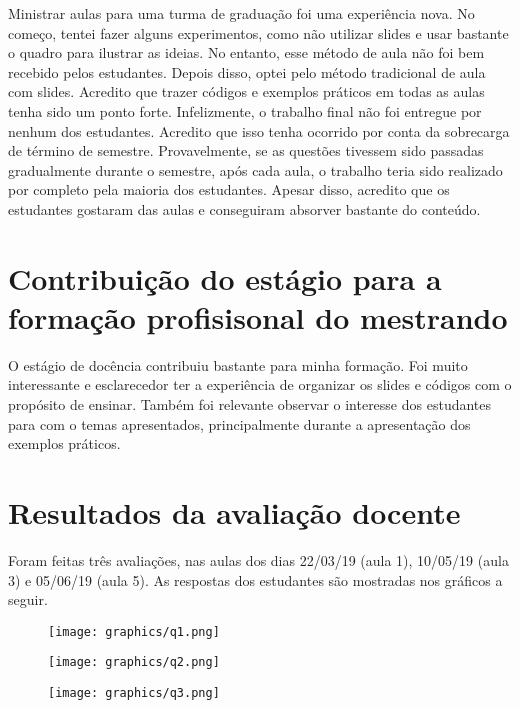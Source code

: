 \documentclass[
	12pt,				%
	openright,			%
	oneside,			%
	a4paper,			%
	chapter=TITLE,		%
	section=TITLE,		%
	english,			%
	french,				%
	spanish,			%
	brazil				%
	]{abntex2}
\begin{document}
Ministrar aulas para uma turma de graduação foi uma experiência nova.
No começo, tentei fazer alguns experimentos, como não utilizar slides e usar bastante o quadro para ilustrar as ideias.
No entanto, esse método de aula não foi bem recebido pelos estudantes.
Depois disso, optei pelo método tradicional de aula com slides.
Acredito que trazer códigos e exemplos práticos em todas as aulas tenha sido um ponto forte.
Infelizmente, o trabalho final não foi entregue por nenhum dos estudantes.
Acredito que isso tenha ocorrido por conta da sobrecarga de término de semestre.
Provavelmente, se as questões tivessem sido passadas gradualmente durante o semestre, após cada aula, o trabalho teria sido realizado por completo pela maioria dos estudantes.
Apesar disso, acredito que os estudantes gostaram das aulas e conseguiram absorver bastante do conteúdo.

\section{Contribuição do estágio para a formação profisisonal do mestrando}

O estágio de docência contribuiu bastante para minha formação.
Foi muito interessante e esclarecedor ter a experiência de organizar os slides e códigos com o propósito de ensinar.
Também foi relevante observar o interesse dos estudantes para com o temas apresentados, principalmente durante a apresentação dos exemplos práticos.

\section{Resultados da avaliação docente}

Foram feitas três avaliações, nas aulas dos dias 22/03/19 (aula 1), 10/05/19 (aula 3) e 05/06/19 (aula 5). As respostas dos estudantes são mostradas nos gráficos a seguir.

\begin{figure}
	\centering
	\texttt{[image: graphics/q1.png]}
\end{figure}

\begin{figure}
	\centering
	\texttt{[image: graphics/q2.png]}
\end{figure}

\begin{figure}
	\centering
	\texttt{[image: graphics/q3.png]}
\end{figure}
\end{document}
